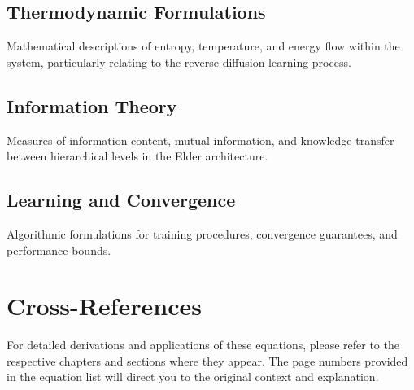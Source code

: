 \subsection{Thermodynamic Formulations}
Mathematical descriptions of entropy, temperature, and energy flow within the system, particularly relating to the reverse diffusion learning process.

\subsection{Information Theory}
Measures of information content, mutual information, and knowledge transfer between hierarchical levels in the Elder architecture.

\subsection{Learning and Convergence}
Algorithmic formulations for training procedures, convergence guarantees, and performance bounds.

\section{Cross-References}

For detailed derivations and applications of these equations, please refer to the respective chapters and sections where they appear. The page numbers provided in the equation list will direct you to the original context and explanation.
